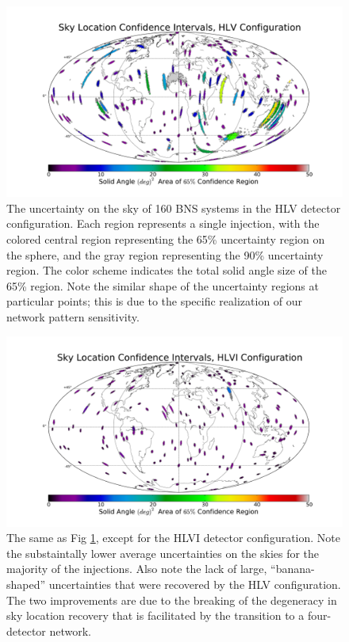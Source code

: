 \documentclass[11pt,a4paper]{emulateapj} 
\begin{document}
\begin{figure}[ht!]
  \centering \includegraphics[angle=0,scale=0.4, trim=5cm 2cm 3cm
    0cm]{HLVsky.pdf}
 \caption{The uncertainty on the sky of 160 BNS systems in the HLV
   detector configuration.  Each region represents a single injection,
   with the colored central region representing the 65\% uncertainty
   region on the sphere, and the gray region representing the 90\%
   uncertainty region.  The color scheme indicates the total solid
   angle size of the 65\% region.  Note the similar shape of the
   uncertainty regions at particular points; this is due to the
   specific realization of our network pattern sensitivity.}
 \label{2525SkyLocHLV}
\end{figure}

\begin{figure}[ht!]
  \centering \includegraphics[angle=0,scale=0.4, trim=5cm 2cm 3cm
    0cm]{HLVIsky.pdf}
 \caption{The same as Fig \ref{2525SkyLocHLV}, except for the HLVI
   detector configuration.  Note the substaintally lower average
   uncertainties on the skies for the majority of the injections.
   Also note the lack of large, ``banana-shaped'' uncertainties that
   were recovered by the HLV configuration.  The two improvements are
   due to the breaking of the degeneracy in sky location recovery that
   is facilitated by the transition to a four-detector network.}
 \label{2525SkyLocHLVI}
\end{figure}
  
\end{document}
